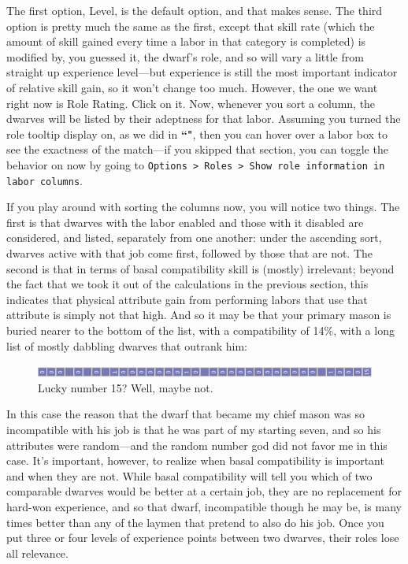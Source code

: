 \documentclass[]{article}
\begin{document}
The first option, Level, is the default option, and that makes sense. The third option is pretty much the
same as the first, except that skill rate (which the amount of skill gained every time a labor in that
category is completed) is modified by, you guessed it, the dwarf's role, and so will vary a little from
straight up experience level---but experience is still the most important indicator of relative skill
gain, so it won't change too much. However, the one we want right now is Role Rating. Click on it. Now,
whenever you sort a column, the dwarves will be listed by their adeptness for that labor. Assuming you
turned the role tooltip display on, as we did in \textbf{``"}, then
you can hover over a labor box to see the exactness of the match---if you skipped that section, you can
toggle the behavior on now by going to \texttt{Options > Roles > Show role information in labor columns}.

If you play around with sorting the columns now, you will notice two things. The first is that dwarves
with the labor enabled and those with it disabled are considered, and listed, separately from one
another: under the ascending sort, dwarves active with that job come first, followed by those that are
not. The second is that in terms of basal compatibility skill is (mostly) irrelevant; beyond the fact
that we took it out of the calculations in the previous section, this indicates that physical attribute
gain from performing labors that use that attribute is simply not that high. And so it may be that your
primary mason is buried nearer to the bottom of the list, with a compatibility of 14\%, with a long list
of mostly dabbling dwarves that outrank him:
\begin{figure}[h!]
\centering
\vspace{-5pt}
\includegraphics[scale=.85]{Sec3Fig4}
\vspace{-5pt}
\caption{Lucky number 15? Well, maybe not.}
\vspace{-10pt}
\end{figure}

In this case the reason that the dwarf that became my chief mason was so incompatible with his job is
that he was part of my starting seven, and so his attributes were random---and the random number god did
not favor me in this case. It's important, however, to realize when basal compatibility is important and
when they are not. While basal compatibility will tell you which of two comparable dwarves would be
better at a certain job, they are no replacement for hard-won experience, and so that dwarf, incompatible
though he may be, is many times better than any of the laymen that pretend to also do his job. Once you
put three or four levels of experience points between two dwarves, their roles lose all relevance.
\end{document}
